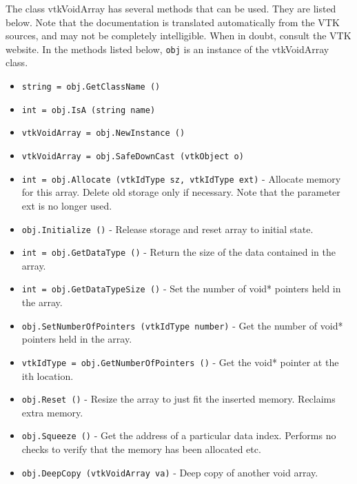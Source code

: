 The class vtkVoidArray has several methods that can be used.
  They are listed below.
Note that the documentation is translated automatically from the VTK sources,
and may not be completely intelligible.  When in doubt, consult the VTK website.
In the methods listed below, \verb|obj| is an instance of the vtkVoidArray class.
\begin{itemize}
\item  \verb|string = obj.GetClassName ()|

\item  \verb|int = obj.IsA (string name)|

\item  \verb|vtkVoidArray = obj.NewInstance ()|

\item  \verb|vtkVoidArray = obj.SafeDownCast (vtkObject o)|

\item  \verb|int = obj.Allocate (vtkIdType sz, vtkIdType ext)| -  Allocate memory for this array. Delete old storage only if necessary.
 Note that the parameter ext is no longer used.

\item  \verb|obj.Initialize ()| -  Release storage and reset array to initial state.

\item  \verb|int = obj.GetDataType ()| -  Return the size of the data contained in the array.

\item  \verb|int = obj.GetDataTypeSize ()| -  Set the number of void* pointers held in the array.

\item  \verb|obj.SetNumberOfPointers (vtkIdType number)| -  Get the number of void* pointers held in the array.

\item  \verb|vtkIdType = obj.GetNumberOfPointers ()| -  Get the void* pointer at the ith location.

\item  \verb|obj.Reset ()| -  Resize the array to just fit the inserted memory. Reclaims extra memory.

\item  \verb|obj.Squeeze ()| -  Get the address of a particular data index. Performs no checks
 to verify that the memory has been allocated etc.

\item  \verb|obj.DeepCopy (vtkVoidArray va)| -  Deep copy of another void array.

\end{itemize}
